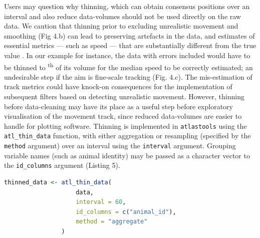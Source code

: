 \documentclass[10pt,paper=a4,headings=standardclasses
]{scrartcl}
\begin{document}
Users may question why thinning, which can obtain consensus positions over an interval and also reduce data-volumes should not be used directly on the raw data.
We caution that thinning prior to excluding unrealistic movement and smoothing (Fig 4.b) can lead to preserving artefacts in the data, and estimates of essential metrics --- such as speed --- that are substantially different from the true value \citep[see Fig. 4.c;][]{noonan2019}.
In our example for instance, the data with errors included would have to be thinned to \textsuperscript{th} of its volume for the median speed to be correctly estimated; an undesirable step if the aim is fine-scale tracking (Fig. 4.c).
The mis-estimation of track metrics could have knock-on consequences for the implementation of subsequent filters based on detecting unrealistic movement.
However, thinning before data-cleaning may have its place as a useful step before exploratory visualisation of the movement track, since reduced data-volumes are easier to handle for plotting software.
%
Thinning is implemented in \texttt{atlastools} using the \texttt{atl\_thin\_data} function, with either aggregation or resampling (specified by the \texttt{method} argument) over an interval using the \texttt{interval} argument.
Grouping variable names (such as animal identity) may be passed as a character vector to the \texttt{id\_columns} argument (Listing 5).

\begin{lstlisting}[float, language=R, style=customR, caption = {Code to thin data by aggregation in \texttt{atlastools}. The method can be either "aggregate" or "resample". 
The time interval is specified in seconds, while the \texttt{id\_columns} allows a character vector of column names to be passed to the function, with these columns used as identity variables.
Both methods return a dataset with one rows per time-interval.}]
thinned_data <- atl_thin_data(
                    data,
                    interval = 60,
                    id_columns = c("animal_id"),
                    method = "aggregate"
                )
\end{lstlisting}
\end{document}

